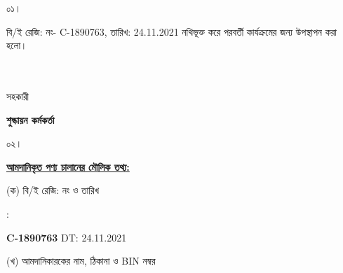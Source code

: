 \documentclass[12pt]{article}
\newcommand{\beno}{C-1890763}
\newcommand{\bedt}{24.11.2021}
\begin{document}
\noindent
\begin{minipage}[t]{0.05\linewidth}
০১।
\end{minipage}
\begin{minipage}[t]{0.95\linewidth}
বি/ই রেজি: নং- {\beno}, তারিখ: {\bedt}
নথিভূক্ত করে
পরবর্তী কার্যক্রমের জন্য উপস্থাপন করা হলো।
\\
\\
\\
\end{minipage}
\begin{minipage}[t]{0.05\linewidth}
\hspace*{1em}
\end{minipage}
\begin{minipage}[t]{0.05\linewidth}
সহকারী
\end{minipage}
\begin{minipage}[t]{0.40\linewidth}
\hspace{1em}
\end{minipage}
\begin{minipage}[t]{0.50\linewidth}
\textbf{শুল্কায়ন কর্মকর্তা}
\\
\end{minipage}
\begin{minipage}[t]{0.05\linewidth}
০২।
\end{minipage}
\begin{minipage}[t]{0.95\linewidth}
\underline{\textbf {আমদানিকৃত পণ্য চালানের
মৌলিক তথ্য:}}
\\
\end{minipage}
\footnotesize
\begin{minipage}[t]{0.05\linewidth}
\hspace*{1em}
\end{minipage}
\begin{minipage}[t]{0.45\linewidth}
(ক) বি/ই রেজি: নং ও তারিখ
\end{minipage}
\begin{minipage}[t]{0.02\linewidth}
:
\end{minipage}
\begin{minipage}[t]{0.50\linewidth}
\textbf{{\beno}} \hspace{2em} DT: {\bedt}
\\
\end{minipage}
\begin{minipage}[t]{0.05\linewidth}
\hspace*{1em}
\end{minipage}
\begin{minipage}[t]{0.45\linewidth}
(খ) আমদানিকারকের নাম, ঠিকানা
ও BIN নম্বর
\end{minipage}
\end{document}
